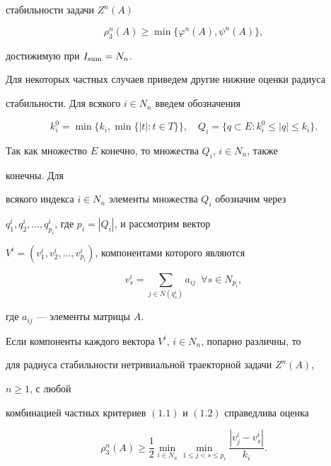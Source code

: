 стабильности задачи $Z^n(A)$ 


$$ 


\rho^n_3(A)\ge\min\{\varphi^n(A),\psi^n(A)\}, 


$$ 


достижимую при $I_{\operatorname{sum}}=N_n$. 


 


Для некоторых частных случаев приведем другие нижние оценки радиуса 


стабильности. Для всякого $i\in N_n$ введем обозначения 


$$ 


k^0_i=\min\big\{k_i,\min\{|t|:t\in T\}\big\},\quad 


Q_i=\{q\subset E:k^0_i\le|q|\le k_i\}. 


$$ 


Так как множество $E$ конечно, то множества $Q_i$, $i\in N_n$, также 


конечны. Для 


всякого индекса $i\in N_n$ элементы множества $Q_i$ обозначим через 


$q^i_1,q^i_2,\dotsc,q^i_{p_i}$, где $p_i=|Q_i|$, и рассмотрим вектор 


$V^i=(v^i_1,v^i_2,\dotsc,v^i_{p_i})$, компонентами которого являются 


$$ 


v^i_s=\sum_{j\in N(q^i_s)}a_{ij}\ \;\forall s\in N_{p_i}, 


$$ 


где $a_{ij}$ --- элементы матрицы $A$. 


 


\begin{thms} 


Если компоненты каждого вектора $V^i$, $i\in N_n$, попарно различны, то 


для радиуса стабильности нетривиальной траекторной задачи $Z^n(A)$, 


$n\ge 1$, с любой 


комбинацией частных критериев $(1.1)$ и $(1.2)$ справедлива оценка 


\begin{equation} 


\rho^n_3(A)\ge\frac{1}{2}\min_{i\in N_n} 


\min_{1\le j<s\le p_i}\frac{|v^i_j-v^i_s|}{k_i}. 


\end{equation} 


\end{thms} 


